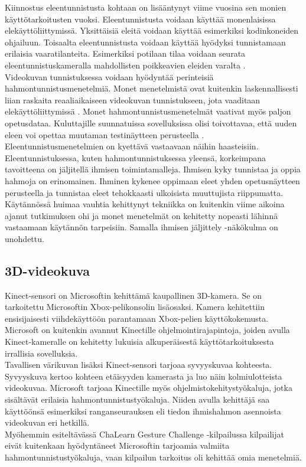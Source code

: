 Kiinnostus eleentunnistusta kohtaan on lisääntynyt viime vuosina sen monien käyttötarkoitusten vuoksi.
Eleentunnistusta voidaan käyttää monenlaisissa elekäyttöliittymissä.  Yksittäisiä eleitä voidaan 
käyttää esimerkiksi kodinkoneiden ohjailuun. \citep {1251144} Toisaalta eleentunnistusta voidaan käyttää hyödyksi tunnistamaan
erilaisia vaaratilanteita. Esimerkiksi potilaan tilaa voidaan seurata eleentunnistuskameralla 
mahdollisten poikkeavien eleiden varalta \citep{chalearn2}.\\

Videokuvan tunnistuksessa voidaan hyödyntää perinteisiä hahmontunnistusmenetelmiä. Monet menetelmistä ovat kuitenkin laskennallisesti liian raskaita 
reaaliaikaiseen videokuvan tunnistukseen, jota vaaditaan elekäyttöliittymissä \citep {1251144}.
Monet hahmontunnistusmenetelmät vaativat myös paljon opetusdataa. Kuluttajille suunnatuissa
sovelluksissa olisi toivottavaa, että uuden eleen voi opettaa muutaman testinäytteen perusteella \citep {1251144}.
Eleentunnistusmenetelmien on kyettävä vastaavaan näihin haasteisiin.\\

Eleentunnistuksessa, kuten hahmontunnistuksessa yleensä, korkeimpana tavoitteena on jäljitellä ihmisen toimintamalleja.
Ihmisen kyky tunnistaa ja oppia hahmoja on erinomainen. Ihminen kykenee oppimaan eleet yhden opetusnäytteen perusteella 
ja tunnistaa eleet tehokkaasti ulkoisista muuttujista riippumatta. Käytännössä huimaa vauhtia kehittynyt tekniikka on kuitenkin
viime aikoina ajanut tutkimuksen ohi ja monet menetelmät on kehitetty nopeasti lähinnä vastaamaan käytännön tarpeisiin. Samalla 
ihmisen jäljittely -näkökulma on unohdettu.
\citep{chalearn2}

\subsection{3D-videokuva}
Kinect-sensori on Microsoftin kehittämä kaupallinen 3D-kamera. Se on tarkoitettu Microsoftin Xbox-pelikonsolin lisäosaksi.
Kamera kehitettiin ensisijaisesti viihdekäyttöön parantamaan Xbox-pelien käyttökokemusta. Microsoft on kuitenkin avannut
Kinectille ohjelmointirajapintoja, joiden avulla Kinect-kameralle on kehitetty lukuisia alkuperäisestä käyttötarkoituksesta 
irrallisia sovelluksia. \citep{kinect}\\

Tavallisen värikuvan lisäksi Kinect-sensori tarjoaa syvyyskuvaa kohteesta. Syvyyskuva kertoo kohteen etäisyyden kamerasta ja luo näin kolmiulotteista videokuvaa. 
Microsoft tarjoaa Kinectille myös ohjelmistokehitystyökaluja, jotka sisältävät erilaisia hahmontunnistustyökaluja.
Niiden avulla kehittäjä saa käyttöönsä esimerkiksi ranganseurauksen eli tiedon ihmishahmon asennoista videokuvan eri hetkillä. \citep{kinect}\\
Myöhemmin esiteltävässä ChaLearn Gesture Challenge -kilpailussa kilpailijat eivät kuitenkaan hyödyntäneet Microsoftin tarjoamia 
valmiita hahmontunnistustyökaluja, vaan kilpailun tarkoitus oli kehittää omia menetelmiä. \\

